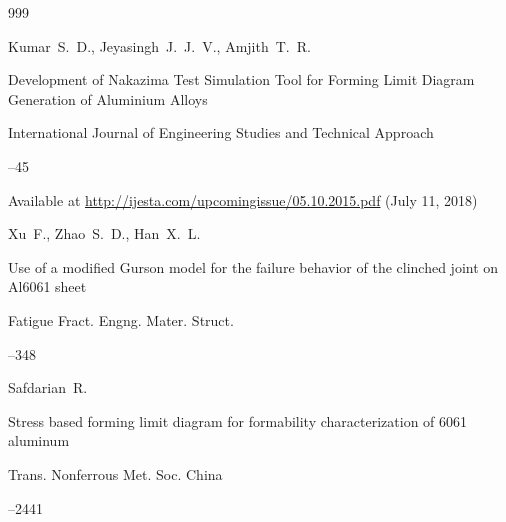 \begin{thebibliography}{999}

\by Kumar~S.~D., Jeyasingh~J.~J.~V., Amjith~T.~R.

\paper Development of Nakazima Test Simulation Tool for Forming Limit Diagram Generation of Aluminium Alloys

\jour International Journal of Engineering Studies and Technical Approach




--45

\elink  Available at \url{http://ijesta.com/upcomingissue/05.10.2015.pdf} (July 11, 2018)




\by Xu~F., Zhao~S.~D., Han~X.~L.

\paper Use of a modified Gurson model for the failure behavior of the clinched joint on Al6061 sheet

\jour Fatigue Fract. Engng. Mater. Struct.




--348






\by Safdarian~R.

\paper Stress based forming limit diagram for formability characterization of 6061 aluminum

\jour Trans. Nonferrous Met. Soc. China




--2441







\end{thebibliography}



%

%

%

%

%

